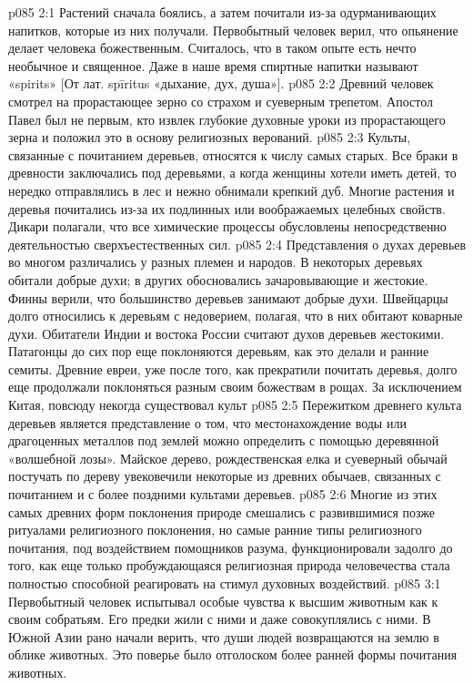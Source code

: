 \vs p085 2:1 Растений сначала боялись, а затем почитали из\hyp{}за одурманивающих напитков, которые из них получали. Первобытный человек верил, что опьянение делает человека божественным. Считалось, что в таком опыте есть нечто необычное и священное. Даже в наше время спиртные напитки называют «spirits» [От лат. spīritus «дыхание, дух, душа»].
\vs p085 2:2 Древний человек смотрел на прорастающее зерно со страхом и суеверным трепетом. Апостол Павел был не первым, кто извлек глубокие духовные уроки из прорастающего зерна и положил это в основу религиозных верований.
\vs p085 2:3 Культы, связанные с почитанием деревьев, относятся к числу самых старых. Все браки в древности заключались под деревьями, а когда женщины хотели иметь детей, то нередко отправлялись в лес и нежно обнимали крепкий дуб. Многие растения и деревья почитались из\hyp{}за их подлинных или воображаемых целебных свойств. Дикари полагали, что все химические процессы обусловлены непосредственно деятельностью сверхъестественных сил.
\vs p085 2:4 Представления о духах деревьев во многом различались у разных племен и народов. В некоторых деревьях обитали добрые духи; в других обосновались зачаровывающие и жестокие. Финны верили, что большинство деревьев занимают добрые духи. Швейцарцы долго относились к деревьям с недоверием, полагая, что в них обитают коварные духи. Обитатели Индии и востока России считают духов деревьев жестокими. Патагонцы до сих пор еще поклоняются деревьям, как это делали и ранние семиты. Древние евреи, уже после того, как прекратили почитать деревья, долго еще продолжали поклоняться разным своим божествам в рощах. За исключением Китая, повсюду некогда существовал культ 
\vs p085 2:5 Пережитком древнего культа деревьев является представление о том, что местонахождение воды или драгоценных металлов под землей можно определить с помощью деревянной «волшебной лозы». Майское дерево, рождественская елка и суеверный обычай постучать по дереву увековечили некоторые из древних обычаев, связанных с почитанием и с более поздними культами деревьев.
\vs p085 2:6 Многие из этих самых древних форм поклонения природе смешались с развившимися позже ритуалами религиозного поклонения, но самые ранние типы религиозного почитания, под воздействием помощников разума, функционировали задолго до того, как еще только пробуждающаяся религиозная природа человечества стала полностью способной реагировать на стимул духовных воздействий.
\vs p085 3:1 Первобытный человек испытывал особые чувства к высшим животным как к своим собратьям. Его предки жили с ними и даже совокуплялись с ними. В Южной Азии рано начали верить, что души людей возвращаются на землю в облике животных. Это поверье было отголоском более ранней формы почитания животных.
